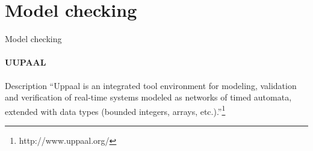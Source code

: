 \section{Model checking}
\begin{frame}{Model checking}
\framesubtitle{UUPAAL}

	\begin{block}{Description}
		``Uppaal is an integrated tool environment for modeling, validation and verification of real-time systems modeled as networks of timed automata, extended with data types (bounded integers, arrays, etc.).''\footnote{http://www.uppaal.org/}
	\end{block}
	
\end{frame}